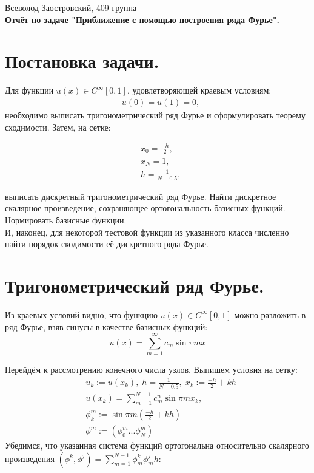 \documentclass[14pt,a4paper]{extarticle}
\newcommand{\1}{\mathbbm{1}}
\begin{document}
\begin{center}

{Всеволод Заостровский, 409 группа}\\
{\bfseries Отчёт по задаче "Приближение с помощью построения ряда Фурье".\\}
\vspace{1cm}

\end{center}

\section{Постановка задачи.}
Для функции $u(x) \in C^{\infty}[0, 1]$, удовлетворяющей краевым условиям:
\begin{align*}
    & u(0) = u(1) = 0,
\end{align*}
необходимо выписать тригонометрический ряд Фурье и сформулировать теорему сходимости. Затем, на сетке:

\begin{align*}
    & x_0 = \frac{-h}{2}, \\
    & x_N = 1, \\
    & h = \frac{1}{N - 0.5},
\end{align*}     

выписать дискретный тригонометрический ряд Фурье. 
Найти дискретное скалярное произведение, сохраняющее ортогональность базисных функций. 
Нормировать базисные функции. 
\\
И, наконец, для некоторой тестовой функции из указанного класса численно найти порядок скодимости её дискретного ряда Фурье.

\section{Тригонометрический ряд Фурье.}
Из краевых условий видно, что функцию $u(x) \in C^{\infty}[0, 1]$ можно разложить в ряд Фурье, 
взяв синусы в качестве базисных функций:
\begin{equation*}
    u(x) = \sum_{m = 1}^{\infty} c_m \sin {\pi m x}
\end{equation*}

Перейдём к рассмотрению конечного числа узлов. Выпишем условия на сетку:
\begin{align*}
    & u_k := u(x_k), \; h = \frac{1}{N - 0.5}, \; x_k := \frac{-h}{2} + k h \\
    & u(x_k) = \sum_{m=1}^{N - 1} c_m^n \sin{\pi m x_k}, \\
    & \phi_k^m := \sin{\pi m (\frac{-h}{2} + k h)} \\
    & \phi^m := (\phi_0^m ... \phi_N^m)
\end{align*} 
Убедимся, что указанная система функций ортогональна относительно скалярного произведения 
${(\phi^k, \phi^j) = \sum_{m = 1}^{N - 1}\phi_m^k \phi_m^j h}$:
\end{document}
